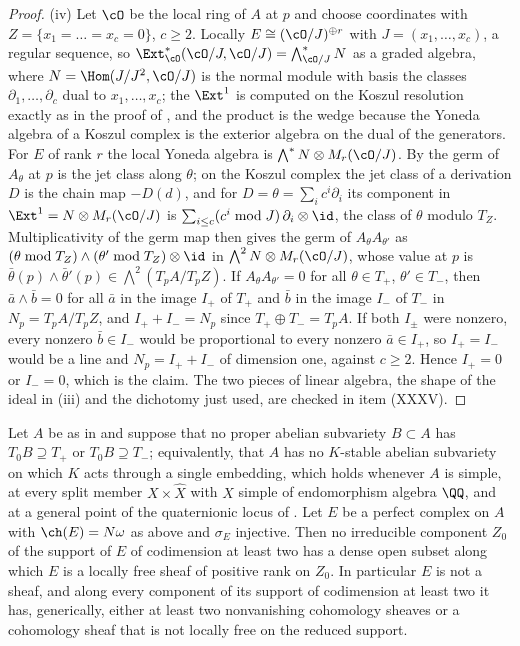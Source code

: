 \begin{proof}
(iv) Let $\cO$ be the local ring of $A$ at $p$ and choose coordinates with
$Z=\{x_{1}=\dots=x_{c}=0\}$, $c\ge2$. Locally $E\cong(\cO/J)^{\oplus r}$
with $J=(x_{1},\dots,x_{c})$, a regular sequence, so
$\Ext^{*}_{\cO}(\cO/J,\cO/J)=\bigwedge^{*}_{\cO/J}N$ as a graded algebra,
where $N=\Hom(J/J^{2},\cO/J)$ is the normal module with basis the classes
$\partial_{1},\dots,\partial_{c}$ dual to $x_{1},\dots,x_{c}$; the
$\Ext^{1}$ is computed on the Koszul resolution exactly as in the proof of
, and the product is the wedge because the Yoneda
algebra of a Koszul complex is the exterior algebra on the dual of the
generators. For $E$ of rank $r$ the local Yoneda algebra is
$\bigwedge^{*}N\otimes M_{r}(\cO/J)$. By  the germ of
$A_{\theta}$ at $p$ is the jet class along $\theta$; on the Koszul complex the
jet class of a derivation $D$ is the chain map $-D(d)$, and for
$D=\theta=\sum_{i}c^{i}\partial_{i}$ its component in $\Ext^{1}=N\otimes M_{r}(\cO/J)$
is $\sum_{i\le c}(c^{i}\bmod J)\,\partial_{i}\otimes\id$, the class of
$\theta$ modulo $T_{Z}$. Multiplicativity of the germ map then gives the germ
of $A_{\theta}A_{\theta'}$ as
$(\theta\bmod T_{Z})\wedge(\theta'\bmod T_{Z})\otimes\id$ in
$\bigwedge^{2}N\otimes M_{r}(\cO/J)$, whose value at $p$ is
$\bar\theta(p)\wedge\bar\theta'(p)\in\bigwedge^{2}(T_{p}A/T_{p}Z)$. If
$A_{\theta}A_{\theta'}=0$ for all $\theta\in T_{+}$, $\theta'\in T_{-}$,
then $\bar a\wedge\bar b=0$ for all $\bar a$ in the image $I_{+}$ of $T_{+}$
and $\bar b$ in the image $I_{-}$ of $T_{-}$ in $N_{p}=T_{p}A/T_{p}Z$, and
$I_{+}+I_{-}=N_{p}$ since $T_{+}\oplus T_{-}=T_{p}A$. If both $I_{\pm}$ were
nonzero, every nonzero $\bar b\in I_{-}$ would be proportional to every
nonzero $\bar a\in I_{+}$, so $I_{+}=I_{-}$ would be a line and
$N_{p}=I_{+}+I_{-}$ of dimension one, against $c\ge2$. Hence $I_{+}=0$ or
$I_{-}=0$, which is the claim. The two pieces of linear algebra, the shape of
the ideal in (iii) and the dichotomy just used, are checked in item (XXXV).
\end{proof}

\begin{corollary}\label{cor:p2shape}
Let $A$ be as in  and suppose that no proper abelian
subvariety $B\subset A$ has $T_{0}B\supseteq T_{+}$ or $T_{0}B\supseteq T_{-}$;
equivalently, that $A$ has no $K$-stable abelian subvariety on which $K$ acts
through a single embedding, which holds whenever $A$ is simple, at every
split member $X\times\widehat X$ with $X$ simple of endomorphism algebra
$\QQ$, and at a general point of the quaternionic locus of .
Let $E$ be a perfect complex on $A$ with $\ch(E)=N\omega$ as above and
$\sigma_{E}$ injective. Then no irreducible component $Z_{0}$ of the support
of $E$ of codimension at least two has a dense open subset along which $E$ is
a locally free sheaf of positive rank on $Z_{0}$. In particular $E$ is not a
sheaf, and along every component of its support of codimension at least two
it has, generically, either at least two nonvanishing cohomology sheaves or a
cohomology sheaf that is not locally free on the reduced support.
\end{corollary}

